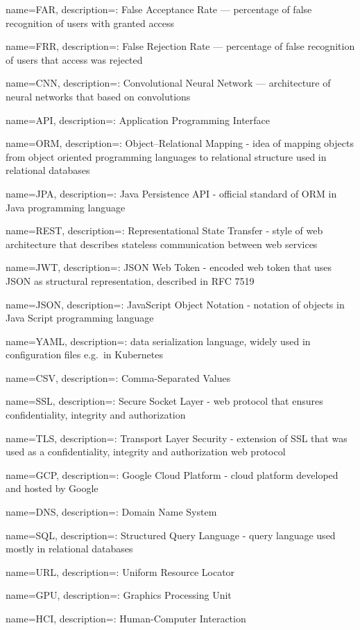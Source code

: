 \makeglossaries

{
name=FAR,
description={: False Acceptance Rate --- percentage of false recognition of users with granted access}
}

{
name=FRR,
description={: False Rejection Rate --- percentage of false recognition of users that access was rejected}
}

{
name=CNN,
description={: Convolutional Neural Network --- architecture of neural networks that based on convolutions}
}

{
name=API,
description={: Application Programming Interface}
}

{
name=ORM,
description={: Object–Relational Mapping - idea of mapping objects from object oriented programming languages to relational structure used in relational databases}
}

{
name=JPA,
description={: Java Persistence API - official standard of ORM in Java programming language}
}

{
name=REST,
description={: Representational State Transfer - style of web architecture that describes stateless communication between web services}
}

{
name=JWT,
description={: JSON Web Token - encoded web token that uses JSON as structural representation, described in RFC 7519}
}

{
name=JSON,
description={: JavaScript Object Notation - notation of objects in Java Script programming language}
}

{
name=YAML,
description={: data serialization language, widely used in configuration files e.g.\ in Kubernetes}
}

{
name=CSV,
description={: Comma-Separated Values}
}

{
name=SSL,
description={: Secure Socket Layer - web protocol that ensures confidentiality, integrity and authorization}
}

{
name=TLS,
description={: Transport Layer Security - extension of SSL that was used as a confidentiality, integrity and authorization web protocol}
}

{
name=GCP,
description={: Google Cloud Platform - cloud platform developed and hosted by Google}
}

{
name=DNS,
description={: Domain Name System}
}

{
name=SQL,
description={: Structured Query Language - query language used mostly in relational databases}
}

{
name=URL,
description={: Uniform Resource Locator}
}

{
name=GPU,
description={: Graphics Processing Unit}
}

 {
name=HCI,
description={: Human-Computer Interaction}
}

